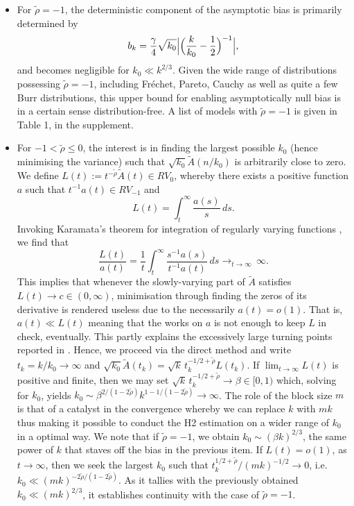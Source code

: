 \documentclass[11pt, a4paper, oneside]{article}
\numberwithin{equation}{section}
\theoremstyle{plain}
\theoremstyle{definition}
\newcommand{\intinf}[1]{\ensuremath{\int_{#1}^{\infty}}}
\newcommand{\arrowf}[1]{\ensuremath{\displaystyle {\mathop {\longrightarrow}_{#1 \rightarrow \infty}\,}}}
\begin{document}
\begin{itemize}
    \item For $\tilde{\rho}=-1$, the deterministic component of the asymptotic bias is primarily determined by
\begin{equation*}
          b_k= \frac{\gamma}{4}\sqrt{k_0}\Bigl|\Bigl(\frac{k}{k_0}-\frac{1}{2}\Bigl)^{-1}\Bigr|,
\end{equation*}
and becomes negligible for $k_0 \ll k^{2/3}$. Given the wide range of distributions possessing $\tilde{\rho}= -1$, including Fr\'echet, Pareto, Cauchy as well as quite a few Burr distributions, this upper bound for enabling asymptotically null bias is in a certain sense distribution-free. A list of models with $\tilde{\rho}= -1$ is given in Table 1, in the supplement.

\item  For $-1<\tilde{\rho}\leq 0$, the interest is in finding the largest possible $k_0$ (hence minimising the variance) such that $\sqrt{k_0} \tilde{A}(n/k_0)$ is arbitrarily close to zero. We define $L(t):= t^{-\tilde{\rho}} \tilde{A}(t) \in RV_0$, whereby there exists a positive function $a$ such that $t^{-1}a(t) \in RV_{-1}$ and
\begin{equation*}
	L(t) = \intinf{t} \frac{a(s)}{s}\, ds.
\end{equation*}
Invoking Karamata's theorem for integration of regularly varying functions \citep[][Theorem B.1.5]{deHaanFerreira2006}, we find that
\begin{equation*}
	\frac{L(t)}{a(t)} = \frac{1}{t} \intinf{t} \frac{s^{-1}a(s)}{t^{-1}a(t)}\, ds \arrowf{t} \infty.
\end{equation*}
This implies that whenever the slowly-varying part of $\tilde{A}$ satisfies $L(t) \rightarrow c \in (0,\infty)$, minimisation through finding the zeros of its derivative is rendered useless due to the necessarily $a(t)=o(1)$. That is, $a(t) \ll L(t)$ meaning that the works on $a$ is not enough to keep $L$ in check, eventually. This partly explains the excessively large turning points reported in \citet[][Section 3]{CN2004}. Hence, we proceed via the direct method and write $t_k= k/k_0 \rightarrow \infty$ and $\sqrt{k_0} \tilde{A} (t_k) = \sqrt{k}\, t_k^{-1/2+ \tilde{\rho}}L(t_k)$. If $\lim_{t\rightarrow \infty}L(t)$ is positive and finite, then we may set $ \sqrt{k}\, t_k^{-1/2+ \tilde{\rho}} \rightarrow \beta \in [0,1)$ which, solving for $k_0$, yields $k_0 \sim \beta^{2/(1-2\tilde{\rho})}k^{1-1/(1-2\tilde{\rho})} \rightarrow \infty$. The role of the block size $m$ is that of a catalyst in the convergence whereby we can replace $k$ with $mk$ thus making it possible to conduct the H2 estimation on a wider range of $k_0$ in a optimal way. We note that if $\tilde{\rho}= -1$, we obtain $k_0 \sim (\beta k)^{2/3}$, the same power of $k$ that staves off the bias in the previous item. If $L(t) =o(1)$, as $t\rightarrow \infty$, then we seek the largest $k_0$ such that $t_k^{1/2+ \tilde{\rho}}/(mk)^{-1/2} \rightarrow 0$, i.e. $ k_0 \ll (mk)^{-2\tilde{\rho}/(1-2\tilde{\rho})}$. As it tallies  with the previously obtained $k_0 \ll (mk)^{2/3}$, it establishes continuity with the case of $\tilde{\rho}=-1$.
\end{itemize}
\end{document}
